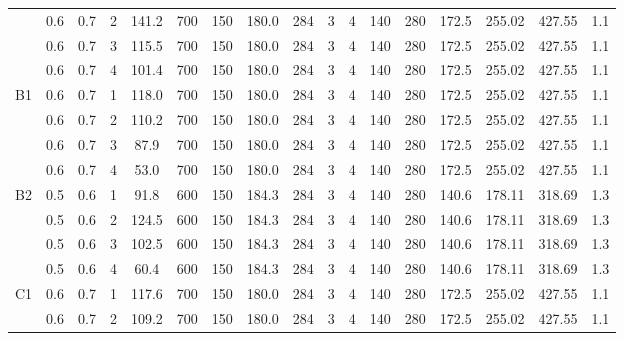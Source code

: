 \begin{table}[H]
{\begin{tabular}{|c|c|c|r|c|c|c|c|c|c|c|c|c|c|c|c|c|}
\cline{2-17}          & 0.6   & 0.7   & 2     & 141.2 & 700   & 150   & 180.0 & 284   & 3     & 4     & 140   & 280   & 172.5 & 255.02 & 427.55 & 1.1 \bigstrut\\
\cline{2-17}          & 0.6   & 0.7   & 3     & 115.5 & 700   & 150   & 180.0 & 284   & 3     & 4     & 140   & 280   & 172.5 & 255.02 & 427.55 & 1.1 \bigstrut\\
\cline{2-17}          & 0.6   & 0.7   & 4     & 101.4 & 700   & 150   & 180.0 & 284   & 3     & 4     & 140   & 280   & 172.5 & 255.02 & 427.55 & 1.1 \bigstrut\\
    \hline
    \multirow{4}[8]{*}{B1} & 0.6   & 0.7   & 1     & 118.0 & 700   & 150   & 180.0 & 284   & 3     & 4     & 140   & 280   & 172.5 & 255.02 & 427.55 & 1.1 \bigstrut\\
\cline{2-17}          & 0.6   & 0.7   & 2     & 110.2 & 700   & 150   & 180.0 & 284   & 3     & 4     & 140   & 280   & 172.5 & 255.02 & 427.55 & 1.1 \bigstrut\\
\cline{2-17}          & 0.6   & 0.7   & 3     & 87.9  & 700   & 150   & 180.0 & 284   & 3     & 4     & 140   & 280   & 172.5 & 255.02 & 427.55 & 1.1 \bigstrut\\
\cline{2-17}          & 0.6   & 0.7   & 4     & 53.0  & 700   & 150   & 180.0 & 284   & 3     & 4     & 140   & 280   & 172.5 & 255.02 & 427.55 & 1.1 \bigstrut\\
    \hline
    \multirow{4}[8]{*}{B2} & 0.5   & 0.6   & 1     & 91.8  & 600   & 150   & 184.3 & 284   & 3     & 4     & 140   & 280   & 140.6 & 178.11 & 318.69 & 1.3 \bigstrut\\
\cline{2-17}          & 0.5   & 0.6   & 2     & 124.5 & 600   & 150   & 184.3 & 284   & 3     & 4     & 140   & 280   & 140.6 & 178.11 & 318.69 & 1.3 \bigstrut\\
\cline{2-17}          & 0.5   & 0.6   & 3     & 102.5 & 600   & 150   & 184.3 & 284   & 3     & 4     & 140   & 280   & 140.6 & 178.11 & 318.69 & 1.3 \bigstrut\\
\cline{2-17}          & 0.5   & 0.6   & 4     & 60.4  & 600   & 150   & 184.3 & 284   & 3     & 4     & 140   & 280   & 140.6 & 178.11 & 318.69 & 1.3 \bigstrut\\
    \hline
    \multirow{4}[8]{*}{C1} & 0.6   & 0.7   & 1     & 117.6 & 700   & 150   & 180.0 & 284   & 3     & 4     & 140   & 280   & 172.5 & 255.02 & 427.55 & 1.1 \bigstrut\\
\cline{2-17}          & 0.6   & 0.7   & 2     & 109.2 & 700   & 150   & 180.0 & 284   & 3     & 4     & 140   & 280   & 172.5 & 255.02 & 427.55 & 1.1 \bigstrut\\

\end{tabular}}
\end{table}
